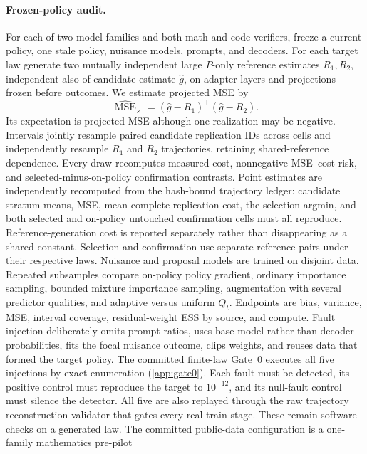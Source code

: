 \documentclass{article}
\begin{document}
\paragraph{Frozen-policy audit.}
For each of two model families and both math and code verifiers, freeze a
current policy, one stale policy, nuisance models, prompts, and decoders.
For each target law generate two mutually independent large $P$-only reference
estimates $R_1,R_2$, independent also of candidate estimate $\widehat g$, on
adapter layers and projections frozen before outcomes. We estimate projected
MSE by
\begin{equation}
\widehat{\operatorname{MSE}}_\times=
(\widehat g-R_1)^\top(\widehat g-R_2).
\end{equation}
Its expectation is projected MSE although one realization may be negative.
Intervals jointly resample paired candidate replication IDs across cells and
independently resample $R_1$ and $R_2$ trajectories, retaining shared-reference
dependence. Every draw recomputes measured cost, nonnegative MSE--cost risk,
and selected-minus-on-policy confirmation contrasts.
Point estimates are independently recomputed from the hash-bound trajectory
ledger: candidate stratum means, MSE, mean complete-replication cost, the
selection argmin, and both selected and on-policy untouched confirmation cells
must all reproduce.
Reference-generation cost is reported separately rather than disappearing as a
shared constant.
Selection and confirmation use separate reference pairs under their respective
laws. Nuisance and proposal
models are trained on disjoint data. Repeated subsamples compare on-policy
policy gradient, ordinary
importance sampling, bounded mixture importance sampling, augmentation with
several predictor qualities, and adaptive versus uniform $Q_t$. Endpoints are
bias, variance, MSE, interval coverage, residual-weight ESS by source, and
compute. Fault injection deliberately omits prompt ratios, uses base-model
rather than decoder probabilities, fits the focal nuisance outcome, clips
weights, and reuses data that formed the target policy.
The committed finite-law Gate~0 executes all five injections by exact
enumeration (\cref{app:gate0}). Each fault must be detected, its positive
control must reproduce the target to $10^{-12}$, and its null-fault control
must silence the detector. All five are also replayed through the raw
trajectory reconstruction validator that gates every real train stage. These
remain software checks on a generated law.
The committed public-data configuration is a one-family mathematics pre-pilot
\end{document}
